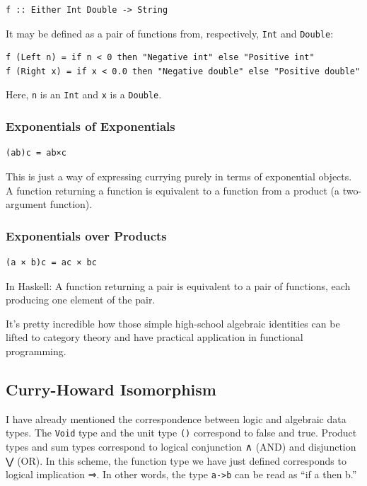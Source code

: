 \begin{verbatim}
f :: Either Int Double -> String
\end{verbatim}

It may be defined as a pair of functions from, respectively,
\texttt{Int} and \texttt{Double}:

\begin{verbatim}
f (Left n) = if n < 0 then "Negative int" else "Positive int"
f (Right x) = if x < 0.0 then "Negative double" else "Positive double"
\end{verbatim}

Here, \texttt{n} is an \texttt{Int} and \texttt{x} is a \texttt{Double}.

\subsubsection{Exponentials of
Exponentials}\label{exponentials-of-exponentials}

\begin{verbatim}
(ab)c = ab×c
\end{verbatim}

This is just a way of expressing currying purely in terms of exponential
objects. A function returning a function is equivalent to a function
from a product (a two-argument function).

\subsubsection{Exponentials over
Products}\label{exponentials-over-products}

\begin{verbatim}
(a × b)c = ac × bc
\end{verbatim}

In Haskell: A function returning a pair is equivalent to a pair of
functions, each producing one element of the pair.

It's pretty incredible how those simple high-school algebraic identities
can be lifted to category theory and have practical application in
functional programming.

\subsection{Curry-Howard Isomorphism}\label{curry-howard-isomorphism}

I have already mentioned the correspondence between logic and algebraic
data types. The \texttt{Void} type and the unit type \texttt{()}
correspond to false and true. Product types and sum types correspond to
logical conjunction ∧ (AND) and disjunction ⋁ (OR). In this scheme, the
function type we have just defined corresponds to logical implication ⇒.
In other words, the type \texttt{a-\textgreater{}b} can be read as ``if
a then b.''

